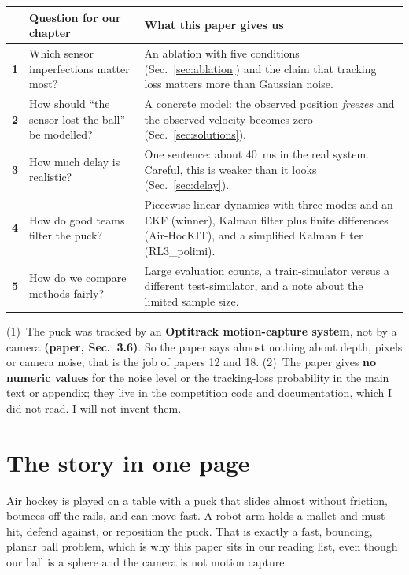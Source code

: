 \documentclass[11pt,a4paper]{article}
\begin{document}
\begin{center}
\begin{tabularx}{\textwidth}{@{}>{\bfseries}c p{5.2cm} X@{}}
\toprule
 & Question for our chapter & What this paper gives us \\
\midrule
1 & Which sensor imperfections matter most? & An ablation with five conditions (Sec.~\ref{sec:ablation}) and the claim that tracking loss matters more than Gaussian noise. \\
2 & How should ``the sensor lost the ball'' be modelled? & A concrete model: the observed position \emph{freezes} and the observed velocity becomes zero (Sec.~\ref{sec:solutions}). \\
3 & How much delay is realistic? & One sentence: about $40$~ms in the real system. Careful, this is weaker than it looks (Sec.~\ref{sec:delay}). \\
4 & How do good teams filter the puck? & Piecewise-linear dynamics with three modes and an EKF (winner), Kalman filter plus finite differences (Air-HocKIT), and a simplified Kalman filter (RL3\_polimi). \\
5 & How do we compare methods fairly? & Large evaluation counts, a train-simulator versus a different test-simulator, and a note about the limited sample size. \\
\bottomrule
\end{tabularx}
\end{center}

\begin{warn}
(1)~The puck was tracked by an \textbf{Optitrack motion-capture system}, not by a camera
\textbf{(paper, Sec.~3.6)}. So the paper says almost nothing about depth, pixels or camera noise;
that is the job of papers 12 and 18. (2)~The paper gives \textbf{no numeric values} for the noise
level or the tracking-loss probability in the main text or appendix; they live in the
competition code and documentation, which I did not read. I will not invent them.
\end{warn}

\section{The story in one page}

Air hockey is played on a table with a puck that slides almost without friction, bounces off the
rails, and can move fast. A robot arm holds a mallet and must hit, defend against, or reposition
the puck. That is exactly a fast, bouncing, planar ball problem, which is why this paper sits in
our reading list, even though our ball is a sphere and the camera is not motion capture.
\end{document}
